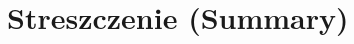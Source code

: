 \documentclass[12pt, withmarginpar]{mwbk}
\begin{document}
\chapter*{Streszczenie (Summary)}

\bigskip

\bigskip

\begin{center}
  \textbf{\tytul}
\end{center}

\bigskip

\begin{center}
  \textbf{\textit{\tytulangielski}}
\end{center}

{\it

}
\end{document}
